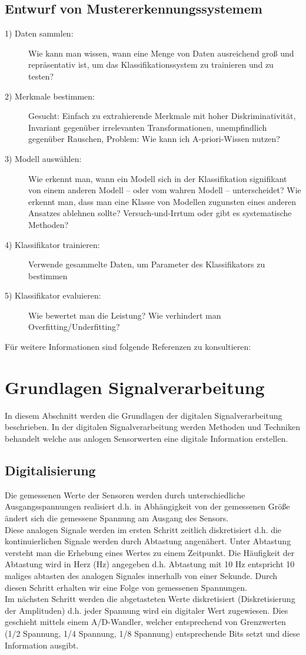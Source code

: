 \documentclass{article} %
\begin{document}
	\subsection{Entwurf von Mustererkennungssystemem}
	\begin{description}
		\item[1) Daten sammlen:] Wie kann man wissen, wann eine Menge von Daten ausreichend groß und repräsentativ ist, um das Klassifikationssystem zu trainieren und zu testen? 
		\item[2) Merkmale bestimmen:] Gesucht: Einfach zu extrahierende Merkmale mit hoher Diskriminativität, Invariant gegenüber irrelevanten Transformationen, unempfindlich gegenüber Rauschen, Problem: Wie kann ich A-priori-Wissen nutzen?
		\item[3) Modell auswählen:] Wie erkennt man, wann ein Modell sich in der Klassifikation signifikant von einem anderen Modell – oder vom wahren Modell – unterscheidet? Wie erkennt man, dass man eine Klasse von Modellen zugunsten eines anderen Ansatzes ablehnen sollte? Versuch-und-Irrtum oder gibt es systematische Methoden?
		\item[4) Klassifikator trainieren:] Verwende gesammelte Daten, um Parameter des Klassifikators zu bestimmen
		\item[5) Klassifikator evaluieren:] Wie bewertet man die Leistung? Wie verhindert man Overfitting/Underfitting?
	\end{description}
	Für weitere Informationen sind folgende Referenzen zu konsultieren: \cite[S. 3-16]{dudaPattern}
\section{Grundlagen Signalverarbeitung}
	In diesem Abschnitt werden die Grundlagen der digitalen Signalverarbeitung beschrieben. In der digitalen Signalverarbeitung werden Methoden und Techniken behandelt welche aus  anlogen Sensorwerten eine digitale Information erstellen.
	\subsection{Digitalisierung}
		Die gemessenen Werte der Sensoren werden durch unterschiedliche Ausgangsspannungen realisiert d.h. in Abhängigkeit von der gemessenen Größe ändert sich die gemessene Spannung am Ausgang des Sensors.\\
		Diese analogen Signale werden im ersten Schritt zeitlich diskretisiert d.h. die kontinuierlichen Signale werden durch Abtastung angenähert. Unter Abtastung versteht man die Erhebung eines Wertes zu einem Zeitpunkt. Die Häufigkeit der Abtastung wird in Herz (Hz) angegeben d.h. Abtastung mit 10 Hz entspricht 10 maliges abtasten des analogen Signales innerhalb von einer Sekunde. Durch diesen Schritt erhalten wir eine Folge von gemessenen Spannungen.\\
		Im nächsten Schritt werden die abgetasteten Werte diskretisiert (Diskretisierung der Amplituden) d.h. jeder Spannung wird ein digitaler Wert zugewiesen. Dies geschieht mittels einem A/D-Wandler, welcher entsprechend von Grenzwerten (1/2 Spannung, 1/4 Spannung, 1/8 Spannung) entsprechende Bits setzt und diese Information ausgibt.
\end{document}
